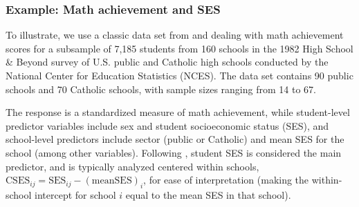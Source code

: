 \subsubsection{Example: Math achievement and SES}

To illustrate, we use a classic data set from %
\citet{BrykRaudenbush:1992} and \citet{RaudenbushBryk:2002}
dealing with math achievement scores for a subsample of 7,185 students from 160 schools
in the 1982 High School \& Beyond survey of U.S. public and Catholic high
schools conducted by the National Center for Education Statistics (NCES).
The data set contains 90 public schools and 70 Catholic schools, with
sample sizes ranging from 14 to 67.

The response is a standardized measure of math achievement, while
student-level predictor variables include sex and student socioeconomic status (SES), and
school-level predictors include sector (public or Catholic) and mean SES for the
school (among other variables).
Following \citet{RaudenbushBryk:2002}, student SES is considered the main predictor, and is
typically analyzed centered within schools,
$\mathrm{CSES}_{ij} = \mathrm{SES}_{ij} - \mathrm{(mean SES)}_i$, for ease of interpretation (making the within-school intercept for school $i$
equal to the mean SES in that school).



